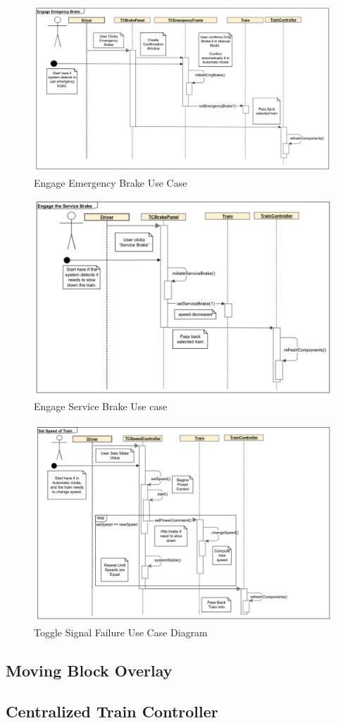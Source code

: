 \documentclass[]{article}
\begin{document}
\begin{figure}[H]
	\centering
	\includegraphics[scale=.5]{tc_emgBrake_usecase}
	\caption{Engage Emergency Brake Use Case}
\end{figure}

\begin{figure}[H]
	\centering
	\includegraphics[scale=.5]{tc_serviceBrake_usecase}
	\caption{Engage Service Brake Use case}
\end{figure}

\begin{figure}[H]
	\centering
	\includegraphics[scale=.5]{tc_setSpeed_usecase}
	\caption{Toggle Signal Failure Use Case Diagram}
\end{figure}



\subsection{Moving Block Overlay}
\subsection{Centralized Train Controller}
\end{document}
